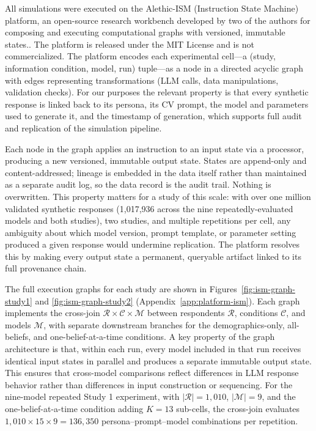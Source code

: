 \documentclass[12pt]{article}
\let\footnote=\endnote
\begin{document}
All simulations were executed on the Alethic-ISM (Instruction State Machine) platform, an open-source research workbench developed by two of the authors for composing and executing computational graphs with versioned, immutable states.\footnote{\url{https://github.com/alethicresearch/alethic-ism}}. The platform is released under the MIT License and is not commercialized.
The platform encodes each experimental cell---a (study, information
condition, model, run) tuple---as a node in a directed acyclic graph with
edges representing transformations (LLM calls, data manipulations,
validation checks). For our purposes the relevant property is that every
synthetic response is linked back to its persona, its CV prompt, the
model and parameters used to generate it, and the timestamp of generation,
which supports full audit and replication of the simulation pipeline.

Each node in the graph applies an instruction to an input state via a
processor, producing a new versioned, immutable output state. States are
append-only and content-addressed; lineage is embedded in the data itself
rather than maintained as a separate audit log, so the data record is the
audit trail. Nothing is overwritten. This property matters for a study of
this scale: with over one million validated synthetic responses
(1{,}017{,}936 across the nine repeatedly-evaluated models and both studies),
two studies, and multiple repetitions per cell, any ambiguity about which model
version, prompt template, or parameter setting produced a given response
would undermine replication. The platform resolves this by making every
output state a permanent, queryable artifact linked to its full provenance
chain.

The full execution graphs for each study are shown in
Figures~\ref{fig:ism-graph-study1} and \ref{fig:ism-graph-study2}
(Appendix~\ref{app:platform-ism}). Each graph
implements the cross-join $\mathcal{R}
\times \mathcal{C} \times \mathcal{M}$ between respondents $\mathcal{R}$,
conditions $\mathcal{C}$, and models $\mathcal{M}$, with separate downstream
branches for the demographics-only, all-beliefs, and one-belief-at-a-time
conditions. A key property of the graph architecture is that, within each
run, every model included in that run receives identical input states in
parallel and produces a separate immutable output state. This ensures that
cross-model comparisons reflect differences in LLM response behavior rather
than differences in input construction or sequencing. For the nine-model
repeated Study 1 experiment, with $|\mathcal{R}| = 1{,}010$,
$|\mathcal{M}| = 9$, and the one-belief-at-a-time condition adding
$K = 13$ sub-cells, the cross-join evaluates
$1{,}010 \times 15 \times 9 = 136{,}350$
persona--prompt--model combinations per repetition.
\end{document}
